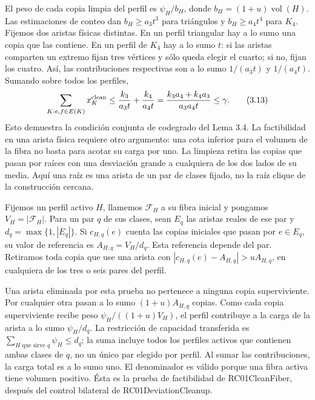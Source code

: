 \documentclass[spanish,11pt,a4paper]{article}
\begin{document}
El peso de cada copia limpia del perfil es \(\psi_H/b_H\), donde \(b_H=(1+u)\operatorname{vol}(H)\). Las estimaciones de conteo dan \(b_H\ge a_3t^3\) para triángulos y \(b_H\ge a_4t^4\) para \(K_4\). Fijemos dos aristas físicas distintas. En un perfil triangular hay a lo sumo una copia que las contiene. En un perfil de \(K_4\) hay a lo sumo \(t\): si las aristas comparten un extremo fijan tres vértices y sólo queda elegir el cuarto; si no, fijan los cuatro. Así, las contribuciones respectivas son a lo sumo \(1/(a_3t)\) y \(1/(a_4t)\). Sumando sobre todos los perfiles, \[
\sum_{K:e,f\in E(K)}x_K^{\rm clean}
\le\frac{k_3}{a_3t}+\frac{k_4}{a_4t}
=\frac{k_3a_4+k_4a_3}{a_3a_4t}\le\gamma.
\tag{3.13}
\] Esto demuestra la condición conjunta de codegrado del Lema 3.4. La factibilidad en una arista física requiere otro argumento: una cota inferior para el volumen de la fibra no basta para acotar su carga por uno. La limpieza retira las copias que pasan por raíces con una desviación grande a cualquiera de los dos lados de su media. Aquí una raíz es una arista de un par de clases fijado, no la raíz clique de la construcción cercana.

Fijemos un perfil activo \(H\), llamemos \(\mathcal F_H\) a su fibra inicial y pongamos \(V_H=|\mathcal F_H|\). Para un par \(q\) de sus clases, sean \(E_q\) las aristas reales de ese par y \(d_q=\max\{1,|E_q|\}\). Si \(c_{H,q}(e)\) cuenta las copias iniciales que pasan por \(e\in E_q\), su valor de referencia es \(A_{H,q}=V_H/d_q\). Esta referencia depende del par. Retiramos toda copia que use una arista con \(|c_{H,q}(e)-A_{H,q}|>uA_{H,q}\), en cualquiera de los tres o seis pares del perfil.

Una arista eliminada por esta prueba no pertenece a ninguna copia superviviente. Por cualquier otra pasan a lo sumo \((1+u)A_{H,q}\) copias. Como cada copia superviviente recibe peso \(\psi_H/((1+u)V_H)\), el perfil contribuye a la carga de la arista a lo sumo \(\psi_H/d_q\). La restricción de capacidad transferida es \(\sum_{H\text{ que sirve }q}\psi_H\le d_q\); la suma incluye todos los perfiles activos que contienen ambas clases de \(q\), no un único par elegido por perfil. Al sumar las contribuciones, la carga total es a lo sumo uno. El denominador es válido porque una fibra activa tiene volumen positivo. Ésta es la prueba de factibilidad de {\ttfamily\small RC01CleanFib\discretionary{\hbox{\ensuremath{\hookrightarrow}}}{}{}er}, después del control bilateral de {\ttfamily\small RC01Deviatio\discretionary{\hbox{\ensuremath{\hookrightarrow}}}{}{}nCleanup}.
\end{document}
